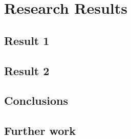 

\chapter{Research Results}


\section{Result 1}

\section{Result 2}

\section{Conclusions}

\section{Further work}  